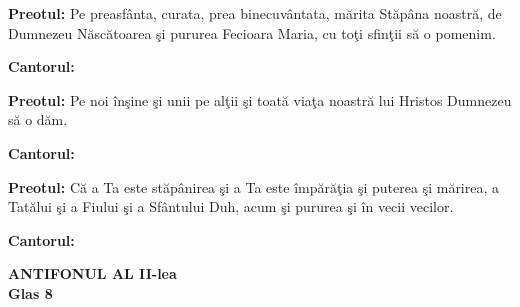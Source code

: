 \documentclass[12pt]{book}
\begin{document}
  \pagebreak

  {\bf Preotul:} Pe preasf\^{a}nta, curata, prea binecuv\^{a}ntata,
  m\u{a}rita St\u{a}p\^{a}na noastr\u{a}, de Dumnezeu
  N\u{a}sc\u{a}toarea \c{s}i pururea Fecioara Maria, cu to\c{t}i
  sfin\c{t}ii s\u{a} o pomenim.

  {\bf Cantorul:}
  \begin{figure}[h]
    \begin{center}
    \end{center}
  \end{figure}

  {\bf Preotul:} Pe noi \^{i}n\c{s}ine \c{s}i unii pe al\c{t}ii
  \c{s}i toat\u{a} via\c{t}a noastr\u{a} lui Hristos Dumnezeu s\u{a} o
  d\u{a}m.

  {\bf Cantorul:}
  \begin{figure}[h]
    \begin{center}
    \end{center}
  \end{figure}

  \pagebreak

  {\bf Preotul:} C\u{a} a Ta este st\u{a}p\^{a}nirea \c{s}i a Ta este
  \^{i}mp\u{a}r\u{a}\c{t}ia \c{s}i puterea \c{s}i m\u{a}rirea, a
  Tat\u{a}lui \c{s}i a Fiului \c{s}i a Sf\^{a}ntului Duh, acum \c{s}i
  pururea \c{s}i \^{i}n vecii vecilor.

  {\bf Cantorul:}
  \begin{figure}[ht]
    \begin{center}
    \end{center}
  \end{figure}

  \begin{center}
    {\large \bf ANTIFONUL AL II-lea\\
      Glas 8}
  \end{center}

  \begin{figure}[h]
    \begin{center}
    \end{center}
  \end{figure}

  \pagebreak

  \begin{figure}[h]
    \begin{center}
    \end{center}
  \end{figure}

  \pagebreak
\end{document}
